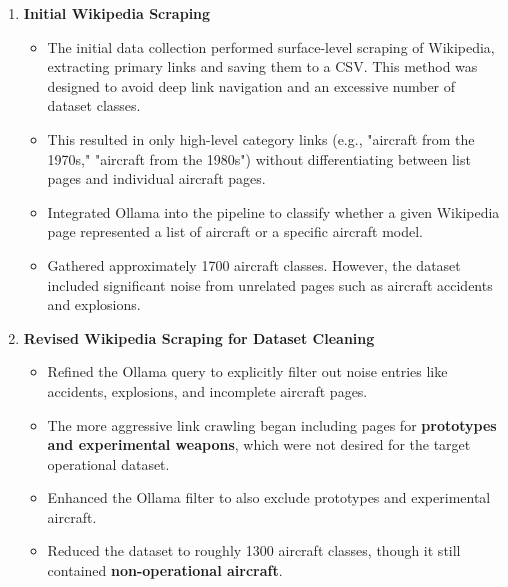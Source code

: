 \documentclass[11pt]{article}
\begin{document}
\begin{enumerate}[label=\textbf{Challenge \arabic*:}]
    \item \textbf{Initial Wikipedia Scraping}
        \begin{itemize}[leftmargin=1.5em]
            \item[\textbf{Approach:}] The initial data collection performed surface-level scraping of Wikipedia, extracting primary links and saving them to a CSV. This method was designed to avoid deep link navigation and an excessive number of dataset classes.
            \item[\textbf{Drawback:}] This resulted in only high-level category links (e.g., "aircraft from the 1970s," "aircraft from the 1980s") without differentiating between list pages and individual aircraft pages.
            \item[\textbf{Solution:}] Integrated Ollama into the pipeline to classify whether a given Wikipedia page represented a list of aircraft or a specific aircraft model.
            \item[\textbf{Outcome:}] Gathered approximately 1700 aircraft classes. However, the dataset included significant noise from unrelated pages such as aircraft accidents and explosions.
        \end{itemize}

    \item \textbf{Revised Wikipedia Scraping for Dataset Cleaning}
        \begin{itemize}[leftmargin=1.5em]
            \item[\textbf{Approach:}] Refined the Ollama query to explicitly filter out noise entries like accidents, explosions, and incomplete aircraft pages.
            \item[\textbf{Drawback:}] The more aggressive link crawling began including pages for \textbf{prototypes and experimental weapons}, which were not desired for the target operational dataset.
            \item[\textbf{Solution:}] Enhanced the Ollama filter to also exclude prototypes and experimental aircraft.
            \item[\textbf{Outcome:}] Reduced the dataset to roughly 1300 aircraft classes, though it still contained \textbf{non-operational aircraft}.
        \end{itemize}


\end{enumerate}
\end{document}
